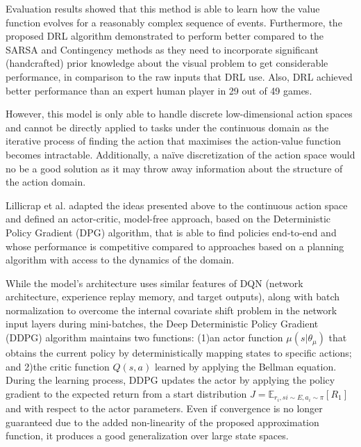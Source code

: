 Evaluation results showed that this method is able to learn how the value function evolves for a reasonably complex sequence of events. Furthermore, the proposed DRL algorithm demonstrated to perform better compared to the SARSA and Contingency\cite{bellemare2012investigating} methods as they need to incorporate significant (handcrafted) prior knowledge about the visual problem to get considerable performance, in comparison to the raw inputs that DRL use. Also, DRL achieved better performance than an expert human player in 29 out of 49 games.

However, this model is only able to handle discrete low-dimensional action spaces and cannot be directly applied to tasks under the continuous domain as the iterative process of finding the action that maximises the action-value function becomes intractable. Additionally, a na\"{i}ve discretization of the action space would no be a good solution as it may throw away information about the structure of the action domain.

Lillicrap et al. \cite{lillicrap2015continuous} adapted the ideas presented above to the continuous action space and defined an actor-critic, model-free approach, based on the Deterministic Policy Gradient\cite{Silver2014} (DPG) algorithm, that is able to find policies end-to-end and whose performance is competitive compared to approaches based on a planning algorithm with access to the dynamics of the domain. 

While the model's architecture uses similar features of DQN (network architecture, experience replay memory, and target outputs), along with batch normalization\cite{ioffe2015batch} to overcome the internal covariate shift problem in the network input layers during mini-batches, the Deep Deterministic Policy Gradient (DDPG) algorithm maintains two functions: (1)an actor function $\mu(s|\theta_{\mu})$ that obtains the current policy by deterministically mapping states to specific actions; and 2)the critic function $Q(s,a)$ learned by applying the Bellman equation. During the learning process, DDPG updates the actor by applying the policy gradient to the expected return from a start distribution $J = \mathbb{E}_{r_i, si \sim E, a_i \sim \pi}[R_1]$ and with respect to the actor parameters. Even if convergence is no longer guaranteed due to the added non-linearity of the proposed approximation function, it produces a good generalization over large state spaces.

